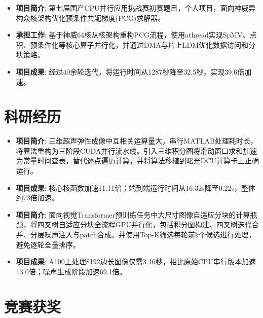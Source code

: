 \documentclass{resume}
\begin{document}
\begin{itemize}
  \item \textbf{项目简介}: 第七届国产CPU并行应用挑战赛初赛题目，个人项目，面向神威异构众核架构优化预条件共轭梯度(PCG)求解器。
  \item \textbf{承担工作}: 基于神威64核从核架构重构PCG流程，使用athread实现SpMV、点积、预条件化等核心算子并行化，并通过DMA与片上LDM优化数据访问和分块策略。
  \item \textbf{项目成果}: 经过40余轮迭代，将运行时间从1287秒降至32.5秒，实现39.6倍加速。
\end{itemize}

\section{科研经历}
\begin{itemize}
  \item \textbf{项目简介}: 三维超声弹性成像中互相关运算量大，串行MATLAB处理耗时长，将算法重构为三阶段CUDA并行流水线。引入三维积分图将滑动窗口求和加速为常量时间查表，替代逐点遍历计算，并将算法移植到曙光DCU计算卡上正确运行。
  \item \textbf{项目成果}: 核心核函数加速11.11倍；端到端运行时间从16.32s降至0.22s，整体约73倍加速。
\end{itemize}

\begin{itemize}
  \item \textbf{项目简介}: 面向视觉Transformer预训练任务中大尺寸图像自适应分块的计算瓶颈，将四叉树自适应分块全流程GPU并行化，包括积分图构建、四叉树迭代合并、分层噪声注入与patch合成。并使用Top-K筛选每轮前k个候选进行处理，避免逐轮全量排序。
  \item \textbf{项目成果}: A100上处理8192边长图像仅需3.16秒，相比原始CPU串行版本加速13.0倍；噪声生成阶段加速69.1倍。
\end{itemize}

\section{竞赛获奖}

%
%
\end{document}

